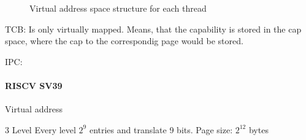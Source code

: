 \begin{figure}
    \centering
    \caption{Virtual address space structure for each thread}
    \label{fig:thread_space}
\end{figure}

TCB: Is only virtually mapped.
Means, that the capability is stored in the cap space, where the cap to the correspondig
page would be stored.

IPC: 

\paragraph{RISCV SV39}
Virtual address

3 Level
Every level $2^9$ entries and translate 9 bits.
Page size: $2^12$ bytes

